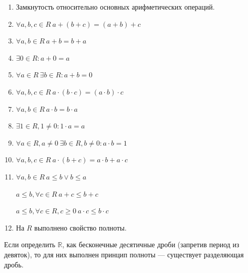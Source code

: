\documentclass[14pt]{extarticle}
\numberwithin{equation}{section}
\newcommand{\RR}{\mathbb{R}}
\begin{document}
\begin{itemize}
            \begin{enumerate}[start=0]
                \item {
                    Замкнутость относительно основных арифметических операций.
                }
                \item {
                    \( \forall a, b, c \in R \ a + (b + c) = (a + b) + c \)
                }
                \item {
                    \( \forall a, b \in R \ a + b = b + a \)
                }
                \item {
                    \( \exists 0 \in R : a + 0 = a \)
                }
                \item {
                    \( \forall a \in R \ \exists b \in R : a + b = 0 \)
                }
                \item {
                    \( \forall a, b, c \in R \ a \cdot (b \cdot c) = (a \cdot b) \cdot c \)
                }
                \item {
                    \( \forall a, b \in R \ a \cdot b = b \cdot a \)
                }
                \item {
                    \( \exists 1 \in R, 1 \neq 0 : 1 \cdot a = a \)
                }
                \item {
                    \( \forall a \in R, a \neq 0 \ \exists b \in R, b \neq 0: a \cdot b = 1 \)
                }
                \item {
                    \( \forall a, b, c \in R \ a \cdot (b + c) = a \cdot b + a \cdot c \)
                }
                \item {
                    \( \forall a, b \in R \ a \leq b \lor b \leq a \)

                    \( a \leq b, \forall c \in R \ a + c \leq b + c \)

                    \( a \leq b, \forall c \in R, c \geq 0 \ a \cdot c \leq b \cdot c \)
                }
                \item {
                    На \( R \) выполнено свойство полноты.
                }
            \end{enumerate}

            Если определить \( \RR \), как бесконечные десятичные дроби (запретив период из девяток),
            то для них выполнен принцип полноты --- существует разделяющая дробь.
    \end{itemize}

    \newpage
\end{document}
